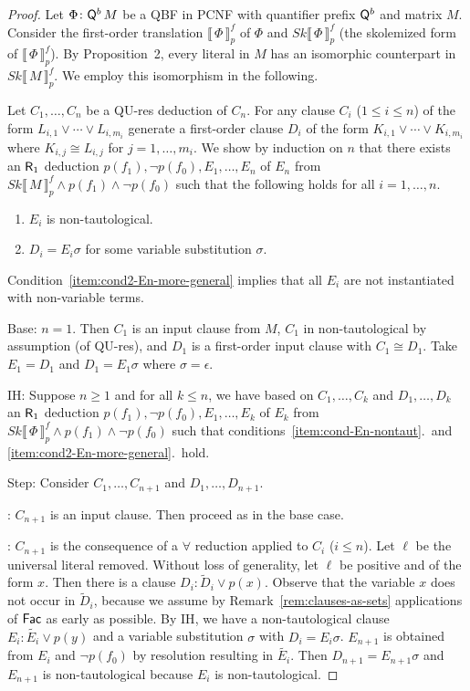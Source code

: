\documentclass{llncs}
\newcommand{\base}{{\sf Base}}
\newcommand{\ih}{{\sf IH}}
\newcommand{\step}{{\sf Step}}
\newcommand{\sccase}[1]{\noindent {\sc Case~#1}}
\newcommand{\qures}{\mbox{\sf QU-res}}
\newcommand{\Rfo}{$\mbox{\sf R}_1$}
\newcommand{\Fac}{$\mbox{\sf Fac}$}
\newcommand{\quantifier}{{\sf Q}}
\newcommand{\QBFtoPL}[3]{\llbracket\,#1\,\rrbracket_{#2}^{#3}}
\newcommand{\SkQBFtoPL}[3]{\mathit{Sk}\llbracket\,#1\,\rrbracket_{#2}^{#3}}
\begin{document}
\begin{proof}
Let $\Phi\colon \quantifier^b\, M$ be a QBF in PCNF with quantifier
prefix $\quantifier^b$ and matrix $M$.  Consider the first-order
translation $\QBFtoPL{\Phi}{p}{f}$ of $\Phi$ and
$\SkQBFtoPL{\Phi}{p}{f}$ (the skolemized form of
$\QBFtoPL{\Phi}{p}{f}$). By Proposition~2, every literal in $M$ has an
isomorphic counterpart in $\SkQBFtoPL{M}{p}{f}$. We employ this
isomorphism in the following.

Let $C_1, \ldots , C_n$ be a \qures{} deduction of $C_n$.  For any
clause $C_i$ ($1\leq i\leq n$) of the form $L_{i,1}\lor \cdots \lor
L_{i,m_i}$ generate a first-order clause $D_i$ of the form $K_{i,1}\lor
\cdots \lor K_{i,m_i}$ where $K_{i,j} \cong L_{i,j}$ for $j=1,\ldots ,
m_i$.  We show by induction on $n$ that there exists an \Rfo{}
deduction $p(f_{1}), \neg p(f_{0}), E_1,\ldots , E_n$ of $E_n$ from $
\SkQBFtoPL{M}{p}{f} \land p(f_{1}) \land \neg p(f_{0})$ such that the
following holds for all $i=1,\ldots, n$.
\begin{enumerate}
\item \label{item:cond-En-nontaut} $E_i$ is non-tautological.



\item \label{item:cond2-En-more-general} 
$D_i = E_i\sigma$ for some variable substitution $\sigma$.
\end{enumerate}
Condition~\ref{item:cond2-En-more-general} implies that all $E_i$ are
not instantiated with non-variable terms.

\medskip
\noindent
\base: $n=1$. Then $C_1$ is an input clause from $M$, $C_1$ in
non-tautological by assumption (of \qures), and $D_1$ is a first-order
input clause with $C_1\cong D_1$. Take $E_1=D_1$ and $D_1=E_1\sigma$
where $\sigma=\epsilon$.

\medskip
\noindent
\ih: Suppose $n\geq 1$ and for all $k\leq n$, we have based on
$C_1,\ldots , C_k$ and $D_1, \ldots , D_k$ an \Rfo{} deduction
$p(f_{1}), \neg p(f_{0}), E_1,\ldots , E_k$ of $E_k$ from
$\SkQBFtoPL{\Phi}{p}{f} \land p(f_{1}) \land \neg p(f_{0})$ such that
conditions~\ref{item:cond-En-nontaut}.\ and
\ref{item:cond2-En-more-general}.\ hold.

\medskip
\noindent
\step: Consider $C_1, \ldots , C_{n+1}$ and  $D_1, \ldots , D_{n+1}$.


\medskip
\sccase{1}: $C_{n+1}$ is an input clause. Then proceed as in the base case.

\medskip
\sccase{2}: $C_{n+1}$ is the consequence of a $\forall$ reduction
applied to $C_i$ ($i\leq n$). Let $\ell$ be the universal literal
removed. Without loss of generality, let $\ell$ be positive and of the
form $x$.  Then there is a clause $D_i\colon \widetilde{D}_i \lor
p(x)$. Observe that the variable $x$ does not occur in
$\widetilde{D}_i$, because we assume by
Remark~\ref{rem:clauses-as-sets} applications of \Fac{} as early as
possible.
By \ih, we have a non-tautological clause $E_i\colon
\widetilde{E_i}\lor p(y)$ and a variable substitution $\sigma$ with
$D_i = E_i\sigma$.  $E_{n+1}$ is obtained from $E_i$ and $\neg
p(f_{0})$ by resolution resulting in $\widetilde{E_i}$. Then $D_{n+1}
= E_{n+1}\sigma$ and $E_{n+1}$ is non-tautological because $E_i$ is
non-tautological.


\end{proof}
\end{document}
